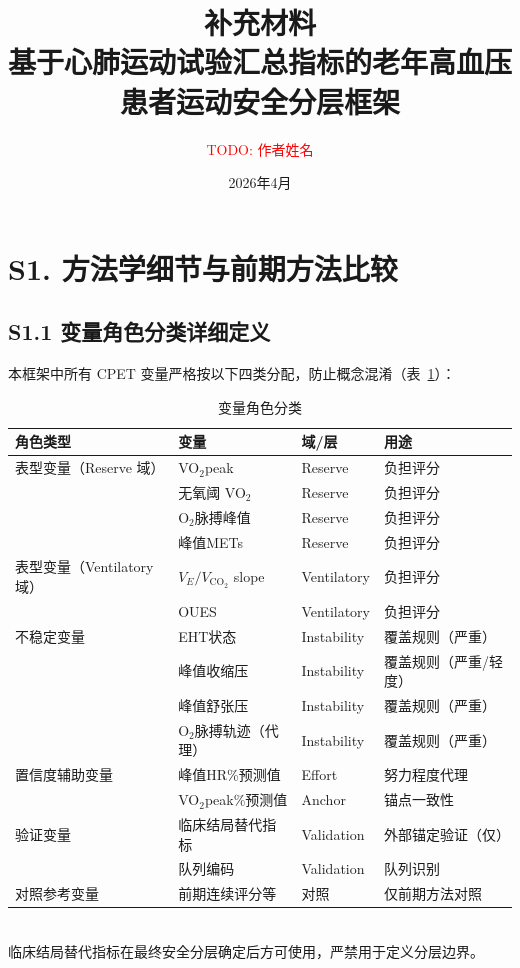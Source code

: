 \documentclass[12pt, a4paper]{ctexart}
\title{补充材料\\
\large 基于心肺运动试验汇总指标的老年高血压患者运动安全分层框架}
\author{\textcolor{red}{TODO: 作者姓名}}
\date{2026年4月}
\begin{document}
\maketitle

\tableofcontents
\clearpage

\section*{S1. 方法学细节与前期方法比较}

\subsection*{S1.1 变量角色分类详细定义}

本框架中所有 CPET 变量严格按以下四类分配，防止概念混淆（表~\ref{tab:s1_variable_roles}）：

\begin{table}[htbp]
\centering
\small
\caption{变量角色分类}
\label{tab:s1_variable_roles}
\begin{tabular}{llll}
\toprule
角色类型 & 变量 & 域/层 & 用途 \\
\midrule
表型变量（Reserve 域）& VO$_2$peak & Reserve & 负担评分 \\
 & 无氧阈 VO$_2$ & Reserve & 负担评分 \\
 & O$_2$脉搏峰值 & Reserve & 负担评分 \\
 & 峰值METs & Reserve & 负担评分 \\
\midrule
表型变量（Ventilatory 域）& $V_E/V_{\text{CO}_2}$ slope & Ventilatory & 负担评分 \\
 & OUES & Ventilatory & 负担评分 \\
\midrule
不稳定变量 & EHT状态 & Instability & 覆盖规则（严重） \\
 & 峰值收缩压 & Instability & 覆盖规则（严重/轻度） \\
 & 峰值舒张压 & Instability & 覆盖规则（严重） \\
 & O$_2$脉搏轨迹（代理） & Instability & 覆盖规则（严重） \\
\midrule
置信度辅助变量 & 峰值HR\%预测值 & Effort & 努力程度代理 \\
 & VO$_2$peak\%预测值 & Anchor & 锚点一致性 \\
\midrule
验证变量 & 临床结局替代指标 & Validation & 外部锚定验证（仅） \\
 & 队列编码 & Validation & 队列识别 \\
\midrule
对照参考变量 & 前期连续评分等 & 对照 & 仅前期方法对照 \\
\bottomrule
\end{tabular}
\\[1ex]
{\footnotesize 临床结局替代指标在最终安全分层确定后方可使用，严禁用于定义分层边界。}
\end{table}
\end{document}
